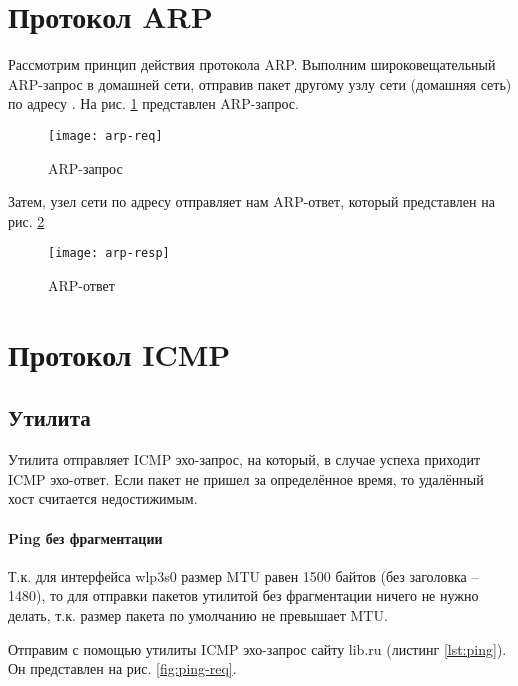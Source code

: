 

\section{Протокол ARP}

Рассмотрим принцип действия протокола ARP. Выполним широковещательный ARP-запрос в домашней сети, отправив  пакет другому узлу сети (домашняя сеть) по адресу .  На рис. \ref{fig:arp-req} представлен ARP-запрос.

\begin{figure}[H]
	\centering
	\texttt{[image: arp-req]}
	\caption{ARP-запрос}
	\label{fig:arp-req}
\end{figure}

Затем, узел сети по адресу  отправляет нам ARP-ответ, который представлен на рис. \ref{fig:arp-resp}

\begin{figure}[H]
	\centering
	\texttt{[image: arp-resp]}
	\caption{ARP-ответ}
	\label{fig:arp-resp}
\end{figure}

\section{Протокол ICMP}

\subsection{Утилита }

Утилита  отправляет ICMP эхо-запрос, на который, в случае успеха приходит ICMP эхо-ответ. Если пакет не пришел за определённое время, то удалённый хост считается недостижимым.

\paragraph{Ping без фрагментации}

Т.к. для интерфейса wlp3s0 размер MTU равен 1500 байтов (без заголовка -- 1480), то для отправки пакетов утилитой  без фрагментации ничего не нужно делать, т.к. размер пакета по умолчанию не превышает MTU.

Отправим с помощью утилиты  ICMP эхо-запрос сайту lib.ru (листинг \ref{lst:ping}). Он представлен на рис. \ref{fig:ping-req}.

